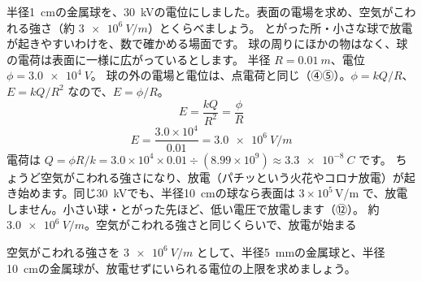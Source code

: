 \label{ph:電-2:ex9}
\begin{phreidai}
半径\qty{1}{cm}の金属球を、\qty{30}{kV}の電位にしました。表面の電場を求め、空気がこわれる強さ（約 $\qty{3e6}{V/m}$）とくらべましょう。
\phbamen
とがった所・小さな球で放電が起きやすいわけを、数で確かめる場面です。
\phmushi
球の周りにほかの物はなく、球の電荷は表面に一様に広がっているとします。
\phzu
半径 $R=\qty{0.01}{m}$、電位 $\phi=\qty{3.0e4}{V}$。
\phriyu
球の外の電場と電位は、点電荷と同じ（④⑤）。$\phi=kQ/R$、$E=kQ/R^2$ なので、$E=\phi/R$。
\phtateru
\[E=\frac{kQ}{R^2}=\frac{\phi}{R}\]
\phtoku
\[E=\frac{3.0\times10^4}{0.01}=\qty{3.0e6}{V/m}\]
電荷は $Q=\phi R/k=3.0\times10^4\times0.01\div(8.99\times10^9)\approx\qty{3.3e-8}{C}$ です。
\phtashikame
ちょうど空気がこわれる強さになり、放電（パチッという火花やコロナ放電）が起き始めます。同じ\qty{30}{kV}でも、半径\qty{10}{cm}の球なら表面は $3\times10^5$\,V/m で、放電しません。小さい球・とがった先ほど、低い電圧で放電します（⑫）。
\kotae 約 $\qty{3.0e6}{V/m}$。空気がこわれる強さと同じくらいで、放電が始まる
\end{phreidai}
\begin{jibun}
空気がこわれる強さを $\qty{3e6}{V/m}$ として、半径\qty{5}{mm}の金属球と、半径\qty{10}{cm}の金属球が、放電せずにいられる電位の上限を求めましょう。
\end{jibun}


